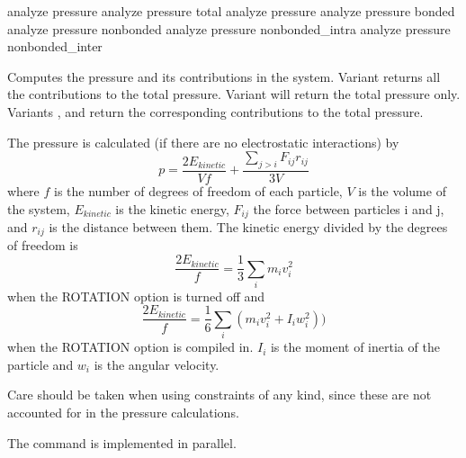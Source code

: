\begin{essyntax}
   analyze pressure
   analyze pressure total
   analyze pressure 
   analyze pressure bonded 
   analyze pressure nonbonded  
   analyze pressure nonbonded_intra 
   analyze pressure nonbonded_inter 
\end{essyntax}

Computes the pressure and its contributions in the system. Variant
 returns all the contributions to the total pressure.
Variant  will return the total pressure only.  Variants
,  and  return the corresponding
contributions to the total pressure.



The pressure is calculated (if there are no electrostatic interactions) by 
\begin{equation}
  p = \frac{2E_{kinetic}}{Vf} + \frac{\sum_{j>i} {F_{ij}r_{ij}}}{3V}
\end{equation}
where $f$ is the number of degrees of freedom of each particle, $V$
is the volume of the system, $E_{kinetic}$ is the kinetic energy, $F_{ij}$ the force between
particles i and j, and $r_{ij}$ is the distance between them.  The kinetic energy divided by the
degrees of freedom is
\begin{equation}
\frac{2E_{kinetic}}{f} = \frac{1}{3}\sum_{i} {m_{i}v_{i}^{2}}
\end {equation}
when the ROTATION option is turned off and
\begin{equation}
\frac{2E_{kinetic}}{f} = \frac{1}{6}\sum_{i}{(m_{i}v_{i}^{2} + I_{i}w_{i}^{2})})
\end{equation}
 when the ROTATION option is compiled in.  $I_{i}$ is the moment of inertia of the particle and
 $w_{i}$ is the angular velocity.

Care should be taken when using constraints of any kind, since these are not accounted for
in the pressure calculations.

The command is implemented in parallel.

